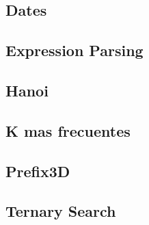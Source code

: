\subsection{Dates}
\raggedbottom
\hrulefill
\subsection{Expression Parsing}
\raggedbottom
\hrulefill
\subsection{Hanoi}
\raggedbottom
\hrulefill
\subsection{K mas frecuentes}
\raggedbottom
\hrulefill
\subsection{Prefix3D}
\raggedbottom
\hrulefill
\subsection{Ternary Search}
\raggedbottom
\hrulefill


